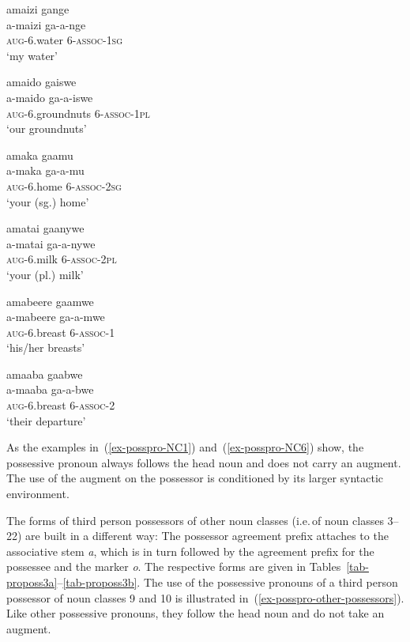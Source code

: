 \ea \label{ex-posspro-NC6}
\begin{xlist}	
\begin{multicols}{2}
\ex 
    \glll   amaizi gange\\
        a-maizi ga-a-nge\\
 	\textsc{aug}-6.water 6-\textsc{assoc}-\textsc{1sg}\\
    \glt  ‘my water’ 
		
\ex 
    \glll   amaido gaiswe\\
    a-maido ga-a-iswe\\
	\textsc{aug}-6.groundnuts 6-\textsc{assoc}-\textsc{1pl}\\
    \glt `our groundnuts'

\ex 
    \glll   amaka gaamu\\
            a-maka ga-a-mu\\
	\textsc{aug}-6.home 6-\textsc{assoc}-2\textsc{sg}\\
    \glt `your (sg.) home'    

\ex 
    \glll   amatai gaanywe\\
            a-matai ga-a-nywe\\
	\textsc{aug}-6.milk 6-\textsc{assoc}-\textsc{2pl}\\
    \glt  ‘your (pl.) milk’
    
\ex 
    \glll   amabeere gaamwe\\
            a-mabeere ga-a-mwe\\
	\textsc{aug}-6.breast 6-\textsc{assoc}-1\\
    \glt  ‘his/her breasts’    

\ex
    \glll amaaba gaabwe\\
    a-maaba ga-a-bwe\\
	\textsc{aug}-6.breast 6-\textsc{assoc}-2\\
    \glt  ‘their departure’
\end{multicols}
\end{xlist}	    
\z

As the examples in~(\ref{ex-posspro-NC1}) and~(\ref{ex-posspro-NC6}) show, the possessive pronoun always follows the head noun and does not carry an augment. 
The use of the augment on the possessor is conditioned by its larger syntactic environment.


The forms of third person possessors of other noun classes (i.e.\,of noun classes 3–22) are built in a different way: 
The possessor agreement prefix attaches to the associative stem \textit{a}, which is in turn followed by the agreement prefix for the possessee and the marker \textit{o}. 
The respective forms are given in Tables~\ref{tab-proposs3a}–\ref{tab-proposs3b}. 
The use of the possessive pronouns of a third person possessor of noun classes 9 and 10 is illustrated in~(\ref{ex-posspro-other-possessors}). 
Like other possessive pronouns, they follow the head noun and do not take an augment.
\newpage %


